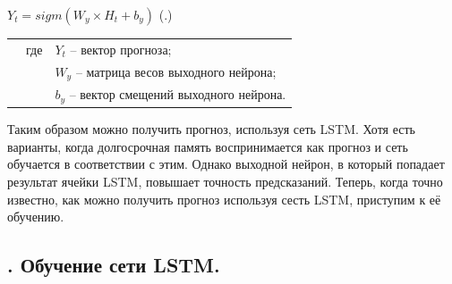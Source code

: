 {  \formulaspace \par \redline 
    $Y_t = sigm(W_y \times H_t + b_y)$
    \hfill (\thechaptercntr .\theformulacntr) \redline
  \formulaspace \addtocounter{formulacntr}{1}

  \begin{tabular}{p{}p{}p{}}
		& где  & $Y_t$ {--} вектор прогноза; \\
		& 	   & $W_y$ {--} матрица весов выходного нейрона; \\
    & 	   & $b_y$ {--} вектор смещений выходного нейрона.
  \end{tabular}

  \par \redline Таким образом можно получить прогноз, используя сеть LSTM. Хотя есть варианты, когда долгосрочная память воспринимается как прогноз и сеть обучается в соответствии с этим. Однако выходной нейрон, в который попадает результат ячейки LSTM, повышает точность предсказаний. Теперь, когда точно известно, как можно получить прогноз используя сесть LSTM, приступим к её обучению. 

  \par
}

\subtitlespace

\subsection*{ 
  \gostTitleFont
  \redline
  \thechaptercntr .\thesubchaptercntr \spc 
  Обучение сети LSTM.
} \addtocounter{subchaptercntr}{1} 
  
\subtitlespace
  
